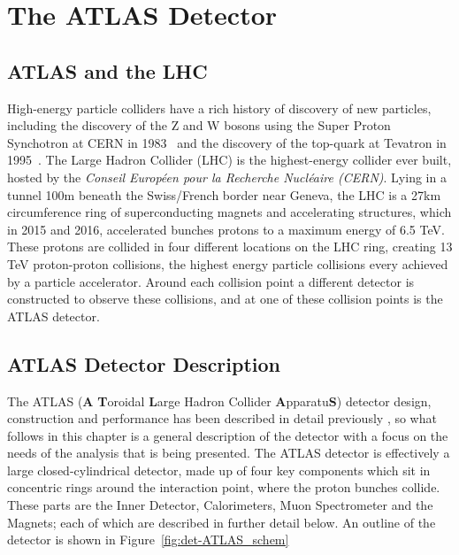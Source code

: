 \chapter{The ATLAS Detector}
\label{chap:det}

\section{ATLAS and the LHC}

High-energy particle colliders have a rich history of discovery of new particles,
including the discovery of the Z and W bosons using the Super Proton Synchotron at CERN in 1983~\cite{det-Wdisc_UA1, det-Zdisc_UA1, det-Wdisc_UA2, det-Zdisc_UA2} 
and the discovery of the  top-quark at Tevatron in 1995~\cite{det-tdisc_CDF, det-tdisc_D0}.
The Large Hadron Collider (LHC) is the highest-energy collider ever built,
hosted by the \textit{Conseil Europ\'een pour la Recherche Nucl\'eaire (CERN)}.
Lying in a tunnel 100m beneath the Swiss/French border near Geneva,
the LHC is a 27km circumference ring of superconducting magnets and accelerating structures,
which in 2015 and 2016, accelerated bunches protons to a maximum energy of 6.5 TeV.
These protons are collided in four different locations on the LHC ring,
creating 13 TeV proton-proton collisions, the highest energy particle collisions every achieved by a particle accelerator.
Around each collision point a different detector is constructed to observe these collisions,
and at one of these collision points is the ATLAS detector.


\section{ATLAS Detector Description}

The ATLAS (\textbf{A} \textbf{T}oroidal \textbf{L}arge Hadron Collider \textbf{A}pparatu\textbf{S}) detector
design, construction and performance has been described in detail previously
\cite{det-ATLAS_Exp, det-ATLAS_TDR, det-ATLAS_Perf},
so what follows in this chapter is a general description of the detector with a focus on the
needs of the analysis that is being presented.
The ATLAS detector is effectively a large closed-cylindrical detector,
made up of four key components which sit in concentric rings around the interaction point, where the proton bunches collide.
These parts are the Inner Detector, Calorimeters, Muon Spectrometer and the Magnets; each of which are described in further detail below.
An outline of the detector is shown in Figure~\ref{fig:det-ATLAS_schem}

